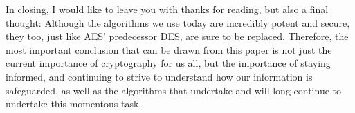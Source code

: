\documentclass[12pt]{report}
\theoremstyle{definition}
\theoremstyle{remark}
\begin{document}
In closing, I would like to leave you with thanks for reading, but also a final thought: Although the algorithms we use today are incredibly potent and secure, they too, just like AES' predecessor DES, are sure to be replaced. Therefore, the most important conclusion that can be drawn from this paper is not just the current importance of cryptography for us all, but the importance of staying informed, and continuing to strive to understand how our information is safeguarded, as well as the algorithms that undertake and will long continue to undertake this momentous task.

\printbibliography
\end{document}
